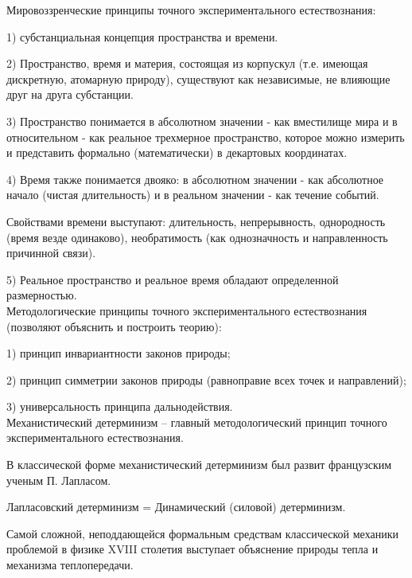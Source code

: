 \documentclass[exam_answers.tex]{subfiles}
\begin{document}
\renewcommand{\baselinestretch}{\blch}

Мировоззренческие принципы точного экспериментального естествознания:

1) субстанциальная концепция пространства и времени.

2) Пространство, время и материя, состоящая из корпускул (т.е. имеющая
дискретную, атомарную природу), существуют как независимые, не влияющие
друг на друга субстанции.

3) Пространство понимается в абсолютном значении - как вместилище мира и в
относительном - как реальное трехмерное пространство, которое можно
измерить и представить формально (математически) в декартовых
координатах.

4) Время также понимается двояко: в абсолютном значении - как абсолютное
начало (чистая длительность) и в реальном значении - как течение событий.

Свойствами времени выступают: длительность, непрерывность, однородность
(время везде одинаково), необратимость (как однозначность и направленность
причинной связи).

5) Реальное пространство и реальное время обладают определенной
размерностью.
\\

Методологические принципы точного экспериментального естествознания (позволяют объяснить и построить теорию):

1) принцип инвариантности законов природы;

2) принцип симметрии законов природы (равноправие всех точек и направлений);

3) универсальность принципа дальнодействия.
\\

Механистический детерминизм -- главный методологический принцип точного
экспериментального естествознания.

В классической форме механистический детерминизм был развит
французским ученым П. Лапласом.

Лапласовский детерминизм = Динамический (силовой) детерминизм.

Самой сложной, неподдающейся формальным средствам классической
механики проблемой в физике XVIII столетия выступает объяснение
природы тепла и механизма теплопередачи.
\end{document}
